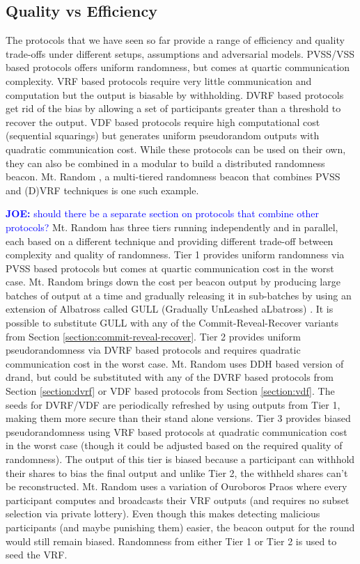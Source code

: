 \documentclass[letterpaper,twocolumn,10pt]{article}
\theoremstyle{definition}
\theoremstyle{remark}
\newcommand{\joenote}[1]{\textcolor{blue}{\textbf{JOE:} #1}}
\begin{document}
\subsection{Quality vs Efficiency}
The protocols that we have seen so far provide a range of efficiency and quality trade-offs under different setups, assumptions and adversarial models. PVSS/VSS based protocols offers uniform randomness, but comes at  quartic communication complexity. 
VRF based protocols require very little communication and computation but the output is biasable by withholding. DVRF based protocols get rid of the bias by allowing a set of participants greater than a threshold to recover the output. VDF based protocols require high computational cost (sequential squarings) but generates uniform pseudorandom outputs with quadratic communication cost. While these protocols can be used on their own, they can also be combined in a modular to build a distributed randomness beacon. Mt. Random \cite{cascudomt}, a multi-tiered randomness beacon that combines PVSS and (D)VRF techniques is one such example. 

\joenote{should there be a separate section on protocols that combine other protocols?}
Mt. Random has three tiers running independently and in parallel, each based on a different technique and providing different trade-off between complexity and quality of randomness. Tier 1 provides uniform randomness via PVSS based protocols but comes at quartic communication cost in the worst case. Mt. Random  brings down the cost per beacon output by producing large batches of output at a time and gradually releasing it in sub-batches by using an extension of Albatross called GULL (Gradually UnLeashed aLbatross) \cite{cascudomt}. It is possible to substitute GULL with any of the Commit-Reveal-Recover variants from Section \ref{section:commit-reveal-recover}. Tier 2 provides uniform pseudorandomness via DVRF based protocols and requires quadratic communication cost in the worst case. Mt. Random uses DDH based version of drand, but could be substituted with any of the DVRF based protocols from Section \ref{section:dvrf} or VDF based protocols from Section \ref{section:vdf}. The seeds for DVRF/VDF are periodically refreshed by using outputs from Tier 1, making them more secure than their stand alone versions. Tier 3 provides biased pseudorandomness using VRF based protocols at quadratic communication cost in the worst case (though it could be adjusted based on the required quality of randomness). The output of this tier is biased because a participant can withhold their shares to bias the final output and unlike Tier 2, the withheld shares can't be reconstructed. Mt. Random uses a variation of Ouroboros Praos where every participant computes and broadcasts their VRF outputs (and requires no subset selection via private lottery). Even though this makes detecting malicious participants (and maybe punishing them) easier, the beacon output for the round would still remain biased. Randomness from either Tier 1 or Tier 2 is used to seed the VRF. 
\end{document}
